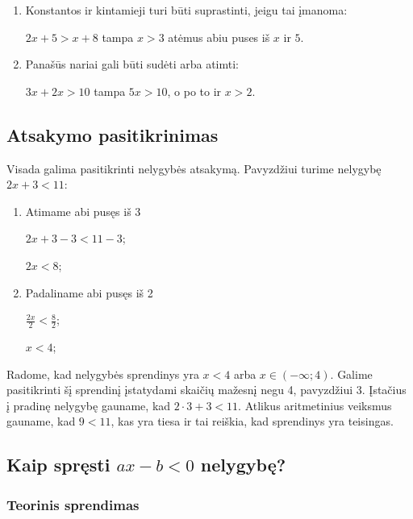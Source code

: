 \documentclass[a4paper]{article}
\begin{document}
\begin{enumerate}
\begin{enumerate}[label*=\arabic*.]
                  \item Konstantos ir kintamieji turi būti suprastinti, jeigu
                        tai įmanoma:

                        $2x+5>x+8$ tampa $x>3$ atėmus abiu puses iš $x$ ir $5$.

                  \item Panašūs nariai gali būti sudėti arba atimti:

                        $3x+2x>10$ tampa $5x>10$, o po to ir $x>2$.

            \end{enumerate}

\end{enumerate}

\subsection{Atsakymo pasitikrinimas}

Visada galima pasitikrinti nelygybės atsakymą. Pavyzdžiui turime nelygybę
$2x+3<11$:

\begin{enumerate}
      \item Atimame abi pusęs iš 3

            $2x+3-3<11-3$;

            $2x<8$;

      \item Padaliname abi pusęs iš 2

            $\frac{2x}{2}<\frac{8}{2}$;

            $x<4$;
\end{enumerate}

Radome, kad nelygybės sprendinys yra $x<4$ arba $x\in (-\infty;4)$. Galime
pasitikrinti šį sprendinį įstatydami skaičių mažesnį negu 4, pavyzdžiui 3.
Įstačius į pradinę nelygybę gauname, kad $2\cdot3+3<11$. Atlikus aritmetinius
veiksmus gauname, kad $9<11$, kas yra tiesa ir tai reiškia, kad sprendinys yra
teisingas.

\subsection{Kaip spręsti $ax-b<0$ nelygybę?}\label{sec:ax_minus_b_inequality}

\subsubsection{Teorinis sprendimas}
\end{document}
